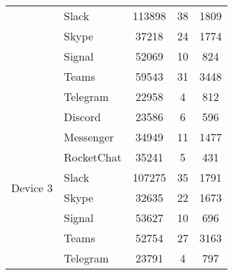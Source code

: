 \documentclass[conference]{IEEEtran}
\begin{document}
\begin{table}[!ht]
{\begin{tabular}{|l|l|c|c|c|}
                              & Slack                             & 113898                & 38                       & 1809                       \\ \cline{2-5} 
                              & Skype                             & 37218                 & 24                       & 1774                       \\ \cline{2-5} 
                              & Signal                            & 52069                 & 10                       & 824                        \\ \cline{2-5} 
                              & Teams                             & 59543                 & 31                       & 3448                       \\ \cline{2-5} 
                              & Telegram                          & 22958                 & 4                        & 812                        \\ \hline
\multirow{8}{*}{Device 3} & Discord                           & 23586                 & 6                        & 596                        \\ \cline{2-5} 
                              & Messenger                         & 34949                 & 11                       & 1477                       \\ \cline{2-5} 
                              & RocketChat                        & 35241                 & 5                        & 431                        \\ \cline{2-5} 
                              & Slack                             & 107275                & 35                       & 1791                       \\ \cline{2-5} 
                              & Skype                             & 32635                 & 22                       & 1673                       \\ \cline{2-5} 
                              & Signal                            & 53627                 & 10                       & 696                        \\ \cline{2-5} 
                              & Teams                             & 52754                 & 27                       & 3163                       \\ \cline{2-5} 
                              & Telegram                          & 23791                 & 4                        & 797                        \\ \hline
\end{tabular}%
}
\end{table}
\end{document}
